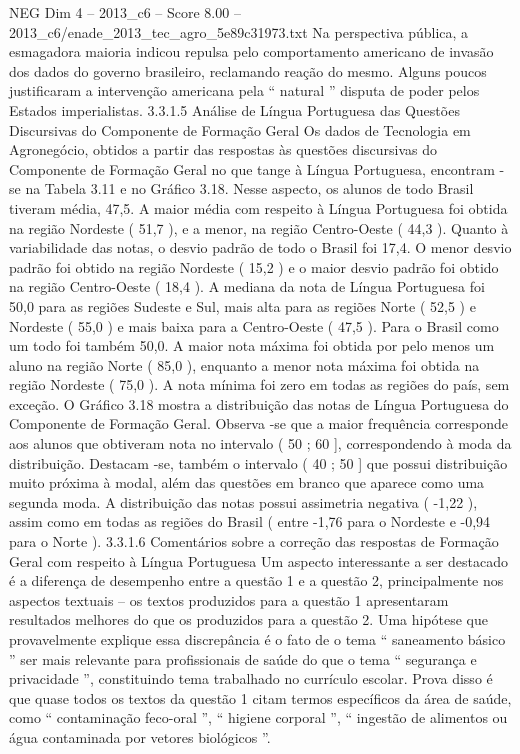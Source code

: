 \begin{textsample}{NEG Dim 4 – 2013\_c6 – Score 8.00 – 2013\_c6/enade\_2013\_tec\_agro\_5e89c31973.txt}
Na perspectiva pública, a esmagadora maioria indicou repulsa pelo comportamento americano de invasão dos dados do governo brasileiro, reclamando reação do mesmo.
Alguns poucos justificaram a intervenção americana pela “ natural ” disputa de poder pelos Estados imperialistas. 3.3.1.5 Análise de Língua Portuguesa das Questões Discursivas do Componente de Formação Geral Os dados de Tecnologia em Agronegócio, obtidos a partir das respostas às questões discursivas do Componente de Formação Geral no que tange à Língua Portuguesa, encontram -se na Tabela 3.11 e no Gráfico 3.18.
Nesse aspecto, os alunos de todo Brasil tiveram média, 47,5.
A maior média com respeito à Língua Portuguesa foi obtida na região Nordeste ( 51,7 ), e a menor, na região Centro-Oeste ( 44,3 ).
Quanto à variabilidade das notas, o desvio padrão de todo o Brasil foi 17,4.
O menor desvio padrão foi obtido na região Nordeste ( 15,2 ) e o maior desvio padrão foi obtido na região Centro-Oeste ( 18,4 ).
A mediana da nota de Língua Portuguesa foi 50,0 para as regiões Sudeste e Sul, mais alta para as regiões Norte ( 52,5 ) e Nordeste ( 55,0 ) e mais baixa para a Centro-Oeste ( 47,5 ).
Para o Brasil como um todo foi também 50,0.
A maior nota máxima foi obtida por pelo menos um aluno na região Norte ( 85,0 ), enquanto a menor nota máxima foi obtida na região Nordeste ( 75,0 ).
A nota mínima foi zero em todas as regiões do país, sem exceção.
O Gráfico 3.18 mostra a distribuição das notas de Língua Portuguesa do Componente de Formação Geral.
Observa -se que a maior frequência corresponde aos alunos que obtiveram nota no intervalo ( 50 ; 60 ], correspondendo à moda da distribuição.
Destacam -se, também o intervalo ( 40 ; 50 ] que possui distribuição muito próxima à modal, além das questões em branco que aparece como uma segunda moda.
A distribuição das notas possui assimetria negativa ( -1,22 ), assim como em todas as regiões do Brasil ( entre -1,76 para o Nordeste e -0,94 para o Norte ). 3.3.1.6 Comentários sobre a correção das respostas de Formação Geral com respeito à Língua Portuguesa Um aspecto interessante a ser destacado é a diferença de desempenho entre a questão 1 e a questão 2, principalmente nos aspectos textuais – os textos produzidos para a questão 1 apresentaram resultados melhores do que os produzidos para a questão 2.
Uma hipótese que provavelmente explique essa discrepância é o fato de o tema “ saneamento básico ” ser mais relevante para profissionais de saúde do que o tema “ segurança e privacidade ”, constituindo tema trabalhado no currículo escolar.
Prova disso é que quase todos os textos da questão 1 citam termos específicos da área de saúde, como “ contaminação feco-oral ”, “ higiene corporal ”, “ ingestão de alimentos ou água contaminada por vetores biológicos ”.

\end{textsample}
